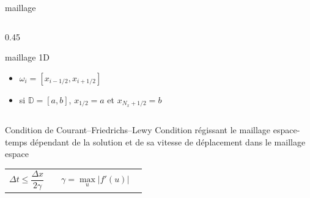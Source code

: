 \begin{frame}{maillage}
\begin{columns}
\begin{column}{0.45\textwidth}
\begin{block}{maillage 1D}
\begin{itemize}
    \item $\omega_i = [x_{i-1/2},x_{i+1/2}]$ \\
    \item si $\mathbb{D} = [a,b]$, $x_{1/2}=a$ et $x_{N_x+1/2} =b$
\end{itemize}
\end{block}
\end{column}
\end{columns}

\begin{block}{Condition de Courant–Friedrichs–Lewy }
Condition régissant le maillage espace-temps dépendant de la solution et de sa vitesse de déplacement dans le maillage espace
\begin{tabular}{p{6cm}c}
\begin{equation}
    \Delta t \leq \frac{\Delta x}{2 \gamma}\qquad \gamma = \max_u |f'(u)|
\end{equation}
&
\raisebox{-15mm}{\usebox{\Riemann}}
\end{tabular}   
\end{block}

\end{frame}


